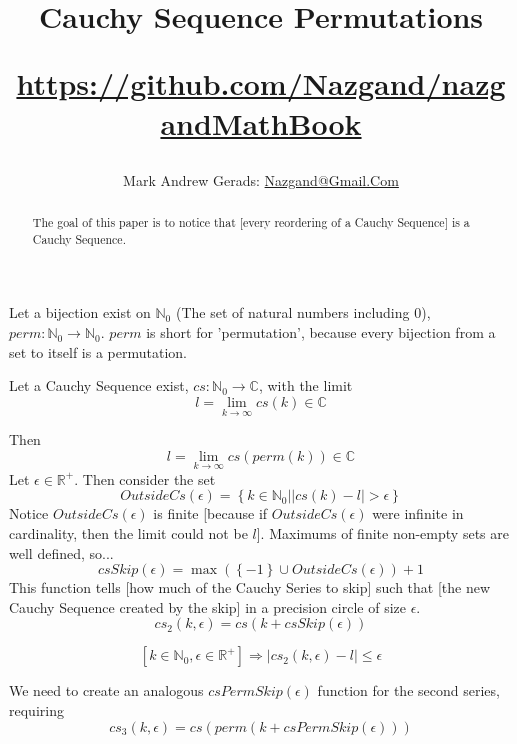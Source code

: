 \documentclass[]{article}
\author{Mark Andrew Gerads: \href{MailTo:Nazgand@Gmail.Com}{Nazgand@Gmail.Com}}
\title{
	Cauchy Sequence Permutations
	
	\href{https://github.com/Nazgand/nazgandMathBook}{https://github.com/Nazgand/nazgandMathBook}
}
\newcommand{\pqty}[1]{{\left(#1\right)}}
\newcommand{\Bqty}[1]{{\left\{#1\right\}}}
\newcommand{\bqty}[1]{{\left[#1\right]}}
\newcommand{\abs}[1]{{\left\lvert#1\right\rvert}}
\numberwithin{equation}{section}
\begin{document}
	
	\maketitle
	
	\begin{abstract}
		The goal of this paper is to notice that [every reordering of a Cauchy Sequence] is a Cauchy Sequence.
	\end{abstract}
	
	Let a bijection exist on $\mathbb{N}_0$ (The set of natural numbers including 0), $perm:\mathbb{N}_0\to\mathbb{N}_0$. $perm$ is short for 'permutation', because every bijection from a set to itself is a permutation.
	
	Let a Cauchy Sequence exist, $cs:\mathbb{N}_0\to\mathbb{C}$, with the limit
	\begin{equation}
		l=\lim\limits_{k\to\infty}cs\pqty{k}\in\mathbb{C}
	\end{equation}

	Then
	\begin{equation}
		l=\lim\limits_{k\to\infty}cs\pqty{perm\pqty{k}}\in\mathbb{C}
	\end{equation}
	Let $\epsilon\in\mathbb{R}^+$. Then consider the set
	\begin{equation}
		OutsideCs\pqty{\epsilon}=\Bqty{k\in\mathbb{N}_0|\abs{cs\pqty{k}-l}>\epsilon}
	\end{equation}
	Notice $OutsideCs\pqty{\epsilon}$ is finite [because if $OutsideCs\pqty{\epsilon}$ were infinite in cardinality, then the limit could not be $l$]. Maximums of finite non-empty sets are well defined, so...
	\begin{equation}
		csSkip\pqty{\epsilon}=\max\pqty{\Bqty{-1}\cup OutsideCs\pqty{\epsilon}}+1
	\end{equation}
	This function tells [how much of the Cauchy Series to skip] such that [the new Cauchy Sequence created by the skip] in a precision circle of size $\epsilon$.
	\begin{equation}
		cs_2\pqty{k,\epsilon}=cs\pqty{k+csSkip\pqty{\epsilon}}
	\end{equation}
	
	\begin{equation}
		\bqty{k\in\mathbb{N}_0,\epsilon\in\mathbb{R}^+}\Rightarrow \abs{cs_2\pqty{k,\epsilon}-l}\leq\epsilon
	\end{equation}

	We need to create an analogous $csPermSkip\pqty{\epsilon}$ function for the second series, requiring
	\begin{equation}
		cs_3\pqty{k,\epsilon}=cs\pqty{perm\pqty{k+csPermSkip\pqty{\epsilon}}}
	\end{equation}
	
\end{document}
